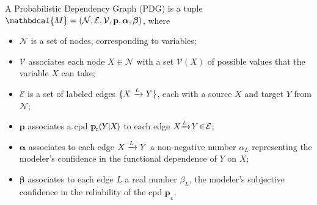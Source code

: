 \documentclass[twoside]{article}
\theoremstyle{plain}
\theoremstyle{definition}
\newcommand{\mat}[1]{\mathbf{#1}}
\newcommand{\ssub}[1]{_{\!_{#1}\!}}
\newcommand{\bp}[1][L]{\mat{p}\ssub{#1}}
\newcommand{\V}{\mathcal V}
\newcommand{\N}{\mathcal N}
\newcommand{\Ed}{\mathcal E}
\newcommand{\dg}[1]{\mathbdcal{#1}}
\newcommand{\ed}[3]{%
		\mathchoice%
		{#2\overset{\smash{\mskip-5mu\raisebox{-3pt}{${#1}$}}}{\xrightarrow{\hphantom{\scriptstyle {#1}}}} #3} %
		{#2\overset{\smash{\mskip-5mu\raisebox{-3pt}{$\scriptstyle {#1}$}}}{\xrightarrow{\hphantom{\scriptstyle {#1}}}} #3}%
		{#2\overset{\smash{\mskip-5mu\raisebox{-3pt}{$\scriptscriptstyle {#1}$}}}{\xrightarrow{\hphantom{\scriptscriptstyle {#1}}}} #3} %
		{#2\overset{\smash{\mskip-5mu\raisebox{-3pt}{$\scriptscriptstyle {#1}$}}}{\xrightarrow{\hphantom{\scriptscriptstyle {#1}}}} #3}} %
\begin{document}
\begin{defn}
    \label{defn:pdg}
	A Probabilistic Dependency Graph (PDG) is a tuple $\dg M = (\N,\Ed,\V,\mat p, \boldsymbol\alpha, \boldsymbol\beta)$, where
    \vspace{-1em}
    \begin{itemize}[leftmargin=1.5em, itemsep=0pt]
        \item $\N$
			is a set of nodes, corresponding to variables;
		\item $\V$
			associates each node $X \in \N$ with a set $\V(X)$ of possible values that the variable $X$ can take;
   		\item $\Ed$
			is a set of labeled  edges $\{ \ed LXY \}$, each with a source
			$X$ and target $Y$ from $\N$;
        \item $\mat p$
		associates
        a cpd $\bp(\mskip-1muY\mskip-1mu|\mskip-1muX\mskip-2mu)$
        to each edge $\ed L{X\!\!}{\!Y} \!\in\! \Ed$;
		\item $\boldsymbol\alpha$
		associates to each edge $\ed L{X}{Y}$ a non-negative number $\alpha_L$
	    representing
	    the modeler's confidence in the functional dependence of $Y$ on $X$;

		\item $\boldsymbol\beta$
		associates to each edge $L$ a real number $\beta_L$,
		the modeler's subjective confidence in the reliability of
		the cpd
		$\bp$.%
	    \qedhere
    \end{itemize}%
\end{defn}
\end{document}
